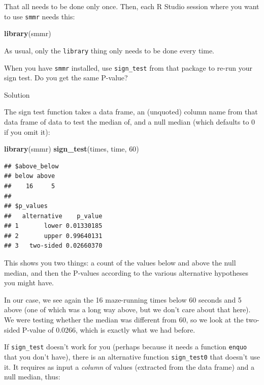 \documentclass[]{tufte-book}
\newenvironment{Shaded}{}{}
\newcommand{\DecValTok}[1]{\textcolor[rgb]{0.25,0.63,0.44}{#1}}
\newcommand{\KeywordTok}[1]{\textcolor[rgb]{0.00,0.44,0.13}{\textbf{#1}}}
\newcommand{\NormalTok}[1]{#1}
\theoremstyle{definition}
\theoremstyle{definition}
\theoremstyle{definition}
\theoremstyle{remark}
\begin{document}
That all needs to be done only once. Then, each R Studio session where
you want to use \texttt{smmr} needs this:

\begin{Shaded}
\begin{Highlighting}[]
\KeywordTok{library}\NormalTok{(smmr)}
\end{Highlighting}
\end{Shaded}

As usual, only the \texttt{library} thing only needs to be done every
time.

When you have \texttt{smmr} installed, use \texttt{sign\_test} from that
package to re-run your sign test. Do you get the same P-value?

Solution

The sign test function takes a data frame, an (unquoted) column name
from that data frame of data to test the median of, and a null median
(which defaults to 0 if you omit it):

\begin{Shaded}
\begin{Highlighting}[]
\KeywordTok{library}\NormalTok{(smmr)}
\KeywordTok{sign_test}\NormalTok{(times, time, }\DecValTok{60}\NormalTok{)}
\end{Highlighting}
\end{Shaded}

\begin{verbatim}
## $above_below
## below above 
##    16     5 
## 
## $p_values
##   alternative    p_value
## 1       lower 0.01330185
## 2       upper 0.99640131
## 3   two-sided 0.02660370
\end{verbatim}

This shows you two things: a count of the values below and above the
null median, and then the P-values according to the various alternative
hypotheses you might have.

In our case, we see again the 16 maze-running times below 60 seconds and
5 above (one of which was a long way above, but we don't care about that
here). We were testing whether the median was different from 60, so we
look at the two-sided P-value of 0.0266, which is exactly what we had
before.

If \texttt{sign\_test} doesn't work for you (perhaps because it needs a
function \texttt{enquo} that you don't have), there is an alternative
function \texttt{sign\_test0} that doesn't use it. It requires as input
a \emph{column} of values (extracted from the data frame) and a null
median, thus:
\end{document}
